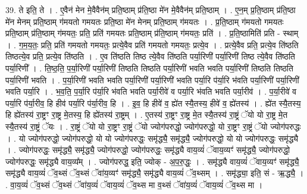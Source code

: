 \documentclass[17pt]{extarticle}
\begin{document}
39. ते इति॒ ते । . ए॒वैन॑ मेन मे॒वैवैन॑म् प्रति॒ष्ठाम् प्र॑ति॒ष्ठा मे॑न मे॒वैवैन॑म् प्रति॒ष्ठाम् । . ए॒न॒म् प्र॒ति॒ष्ठाम् प्र॑ति॒ष्ठा मे॑न मेनम् प्रति॒ष्ठाम् ग॑मयतो गमयतः प्रति॒ष्ठा मे॑न मेनम् प्रति॒ष्ठाम् ग॑मयतः । . प्र॒ति॒ष्ठाम् ग॑मयतो गमयतः प्रति॒ष्ठाम् प्र॑ति॒ष्ठाम् ग॑मयतः॒ प्रति॒ प्रति॑ गमयतः प्रति॒ष्ठाम् प्र॑ति॒ष्ठाम् ग॑मयतः॒ प्रति॑ । . प्र॒ति॒ष्ठामिति॑ प्रति - स्थाम् । . ग॒म॒य॒तः॒ प्रति॒ प्रति॑ गमयतो गमयतः॒ प्रत्ये॒वैव प्रति॑ गमयतो गमयतः॒ प्रत्ये॒व । . प्रत्ये॒वैव प्रति॒ प्रत्ये॒व ति॑ष्ठति तिष्ठत्ये॒व प्रति॒ प्रत्ये॒व ति॑ष्ठति । . ए॒व ति॑ष्ठति तिष्ठ त्ये॒वैव ति॑ष्ठति पर्या॒रिणी॑ पर्या॒रिणी॑ तिष्ठ त्ये॒वैव ति॑ष्ठति पर्या॒रिणी᳚ । . ति॒ष्ठ॒ति॒ प॒र्या॒रिणी॑ पर्या॒रिणी॑ तिष्ठति तिष्ठति पर्या॒रिणी॑ भवति भवति पर्या॒रिणी॑ तिष्ठति तिष्ठति पर्या॒रिणी॑ भवति । . प॒र्या॒रिणी॑ भवति भवति पर्या॒रिणी॑ पर्या॒रिणी॑ भवति पर्या॒रि प॑र्या॒रि भ॑वति पर्या॒रिणी॑ पर्या॒रिणी॑ भवति पर्या॒रि । . भ॒व॒ति॒ प॒र्या॒रि प॑र्या॒रि भ॑वति भवति पर्या॒रीवे॑ व पर्या॒रि भ॑वति भवति पर्या॒रीव॑ । . प॒र्या॒रीवे॑ व पर्या॒रि प॑र्या॒रीव॒ हि हीव॑ पर्या॒रि प॑र्या॒रीव॒ हि । . इ॒व॒ हि हीवे॑ व॒ ह्ये॑त स्यै॒तस्य॒ हीवे॑ व॒ ह्ये॑तस्य॑ । . ह्ये॑त स्यै॒तस्य॒ हि ह्ये॑तस्य॑ रा॒ष्ट्रꣳ रा॒ष्ट्र मे॒तस्य॒ हि ह्ये॑तस्य॑ रा॒ष्ट्रम् । . ए॒तस्य॑ रा॒ष्ट्रꣳ रा॒ष्ट्र मे॒त स्यै॒तस्य॑ रा॒ष्ट्रं ॅयो यो रा॒ष्ट्र मे॒त स्यै॒तस्य॑ रा॒ष्ट्रं ॅयः । . रा॒ष्ट्रं ॅयो यो रा॒ष्ट्रꣳ रा॒ष्ट्रं ॅयो ज्योग॑परुद्धो॒ ज्योग॑परुद्धो॒ यो रा॒ष्ट्रꣳ रा॒ष्ट्रं ॅयो ज्योग॑परुद्धः । . यो ज्योग॑परुद्धो॒ ज्योग॑परुद्धो॒ यो यो ज्योग॑परुद्धः॒ समृ॑द्ध्यै॒ समृ॑द्ध्यै॒ ज्योग॑परुद्धो॒ यो यो ज्योग॑परुद्धः॒ समृ॑द्ध्यै । . ज्योग॑परुद्धः॒ समृ॑द्ध्यै॒ समृ॑द्ध्यै॒ ज्योग॑परुद्धो॒ ज्योग॑परुद्धः॒ समृ॑द्ध्यै वाय॒व्यं॑ ॅवाय॒व्यꣳ॑ समृ॑द्ध्यै॒ ज्योग॑परुद्धो॒ ज्योग॑परुद्धः॒ समृ॑द्ध्यै वाय॒व्य᳚म् । . ज्योग॑परुद्ध॒ इति॒ ज्योक् - अ॒प॒रु॒द्धः॒ । . समृ॑द्ध्यै वाय॒व्यं॑ ॅवाय॒व्यꣳ॑ समृ॑द्ध्यै॒ समृ॑द्ध्यै वाय॒व्यं॑ ॅव॒थ्सं ॅव॒थ्सं ॅवा॑य॒व्यꣳ॑ समृ॑द्ध्यै॒ समृ॑द्ध्यै वाय॒व्यं॑ ॅव॒थ्सम् । . समृ॑द्ध्या॒ इति॒ सं - ऋ॒द्ध्यै॒ । . वा॒य॒व्यं॑ ॅव॒थ्सं ॅव॒थ्सं ॅवा॑य॒व्यं॑ ॅवाय॒व्यं॑ ॅव॒थ्स मा व॒थ्सं ॅवा॑य॒व्यं॑ ॅवाय॒व्यं॑ ॅव॒थ्स मा । \newline
\pagebreak
{}
\end{document}
